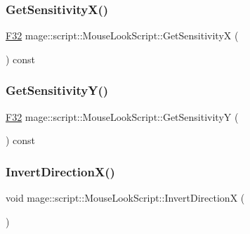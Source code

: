 \subsubsection{\texorpdfstring{Get\+Sensitivity\+X()}{GetSensitivityX()}}
{\footnotesize\ttfamily \hyperlink{namespacemage_aa97e833b45f06d60a0a9c4fc22ae02c0}{F32} mage\+::script\+::\+Mouse\+Look\+Script\+::\+Get\+SensitivityX (\begin{DoxyParamCaption}{ }\end{DoxyParamCaption}) const\hspace{0.3cm}{\ttfamily [noexcept]}}

\hypertarget{classmage_1_1script_1_1_mouse_look_script_a39303e2d535ecc610ac4ea2f23825452}{}\label{classmage_1_1script_1_1_mouse_look_script_a39303e2d535ecc610ac4ea2f23825452} 
\subsubsection{\texorpdfstring{Get\+Sensitivity\+Y()}{GetSensitivityY()}}
{\footnotesize\ttfamily \hyperlink{namespacemage_aa97e833b45f06d60a0a9c4fc22ae02c0}{F32} mage\+::script\+::\+Mouse\+Look\+Script\+::\+Get\+SensitivityY (\begin{DoxyParamCaption}{ }\end{DoxyParamCaption}) const\hspace{0.3cm}{\ttfamily [noexcept]}}

\hypertarget{classmage_1_1script_1_1_mouse_look_script_aa527806c78873eab652dd6337a75b89f}{}\label{classmage_1_1script_1_1_mouse_look_script_aa527806c78873eab652dd6337a75b89f} 
\subsubsection{\texorpdfstring{Invert\+Direction\+X()}{InvertDirectionX()}}
{\footnotesize\ttfamily void mage\+::script\+::\+Mouse\+Look\+Script\+::\+Invert\+DirectionX (\begin{DoxyParamCaption}{ }\end{DoxyParamCaption})\hspace{0.3cm}{\ttfamily [noexcept]}}

